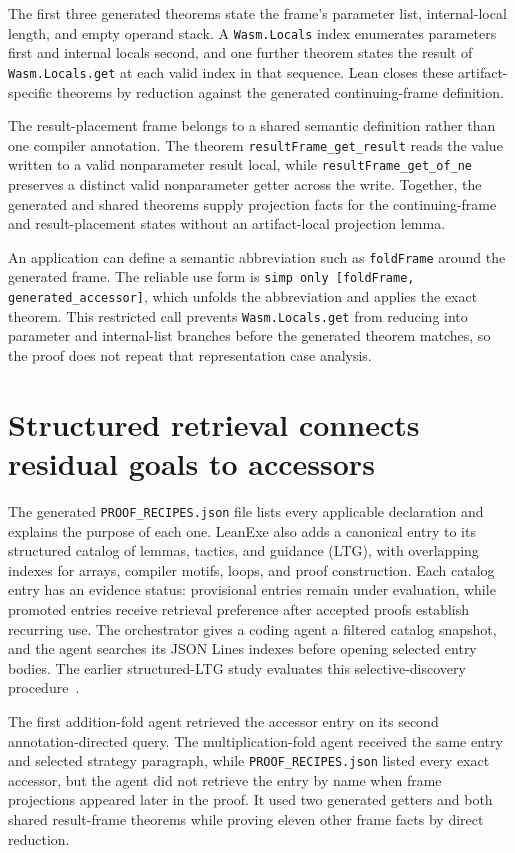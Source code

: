 \documentclass[10pt]{article}
\newcommand{\code}[1]{\texttt{#1}}
\begin{document}
The first three generated theorems state the frame's parameter list, internal-local length, and empty operand stack.  A \code{Wasm.Locals} index enumerates parameters first and internal locals second, and one further theorem states the result of \code{Wasm.Locals.get} at each valid index in that sequence.  Lean closes these artifact-specific theorems by reduction against the generated continuing-frame definition.

The result-placement frame belongs to a shared semantic definition rather than one compiler annotation.  The theorem \code{resultFrame\_get\_result} reads the value written to a valid nonparameter result local, while \code{resultFrame\_get\_of\_ne} preserves a distinct valid nonparameter getter across the write.  Together, the generated and shared theorems supply projection facts for the continuing-frame and result-placement states without an artifact-local projection lemma.

An application can define a semantic abbreviation such as \code{foldFrame} around the generated frame.  The reliable use form is \code{simp only [foldFrame, generated\_accessor]}, which unfolds the abbreviation and applies the exact theorem.  This restricted call prevents \code{Wasm.Locals.get} from reducing into parameter and internal-list branches before the generated theorem matches, so the proof does not repeat that representation case analysis.

\section{Structured retrieval connects residual goals to accessors}

The generated \code{PROOF\_RECIPES.json} file lists every applicable declaration and explains the purpose of each one.  LeanExe also adds a canonical entry to its structured catalog of lemmas, tactics, and guidance (LTG), with overlapping indexes for arrays, compiler motifs, loops, and proof construction.  Each catalog entry has an evidence status: provisional entries remain under evaluation, while promoted entries receive retrieval preference after accepted proofs establish recurring use.  The orchestrator gives a coding agent a filtered catalog snapshot, and the agent searches its JSON Lines indexes before opening selected entry bodies.  The earlier structured-LTG study evaluates this selective-discovery procedure~\cite{Yang2023LeanDojo,LeanExeStructuredLTG}.

The first addition-fold agent retrieved the accessor entry on its second annotation-directed query.  The multiplication-fold agent received the same entry and selected strategy paragraph, while \code{PROOF\_RECIPES.json} listed every exact accessor, but the agent did not retrieve the entry by name when frame projections appeared later in the proof.  It used two generated getters and both shared result-frame theorems while proving eleven other frame facts by direct reduction.
\end{document}
